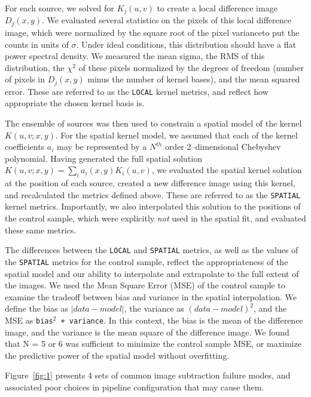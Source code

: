\documentclass[floatfix, apj]{emulateapj}
\begin{document}
For each source, we solved for $K_j(u,v)$ to create a local difference image $D_j(x,y)$.
We evaluated several statistics on the pixels of this local difference image, which were normalized by the square root of the pixel varianceto put the counts in units of $\sigma$.
Under ideal conditions, this distribution should have a flat power spectral density.
We measured the mean sigma, the RMS of this distribution, the $\chi^2$ of these pixels normalized by the degrees of freedom (number of pixels in $D_j(x,y)$ minus the number of kernel bases), and the mean squared error.
These are referred to as the {\tt LOCAL} kernel metrics, and reflect how appropriate the chosen kernel basis is.

The ensemble of sources was then used to constrain a spatial model of the kernel $K(u,v;x,y)$.
For the spatial kernel model, we assumed that each of the kernel coefficients $a_i$ may be represented by a $N^{th}$ order 2--dimensional Chebyshev polynomial.
Having generated the full spatial solution $K(u,v;x,y) = \sum_i a_i(x,y) K_i(u,v)$, we evaluated the spatial kernel solution at the position of each source, created a new difference image using this kernel, and recalculated the metrics defined above.
These are referred to as the {\tt SPATIAL} kernel metrics.
Importantly, we also interpolated this solution to the positions of the control sample, which were explicitly {\it not} used in the spatial fit, and evaluated these same metrics.

 
The differences between the {\tt LOCAL} and {\tt SPATIAL} metrics, as well as the values of the {\tt SPATIAL} metrics for the control sample, reflect the appropriateness of the spatial model and our ability to interpolate and extrapolate to the full extent of the images.
We used the Mean Square Error (MSE) of the control sample to examine the tradeoff between bias and variance in the spatial interpolation.
We define the bias as $\left| data - model \right|$, the variance as $(data - model)^2$, and the MSE as {\tt bias$^2$ + variance}.  
In this context, the bias is the mean of the difference image, and the variance is the mean square of the difference image.
We found that N = 5 or 6 was sufficient to minimize the control sample MSE, or maximize the predictive power of the spatial model without overfitting.

Figure~\ref{fig:1} presents 4 sets of common image subtraction failure modes, and associated poor choices in pipeline configuration that may cause them.
\end{document}
